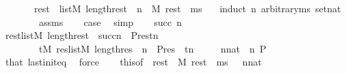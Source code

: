 \begin{isabellebody}
\ \ \ \ \ \ \ {\isacharparenleft}{\kern0pt}{\isasymforall}rest\ {\isasymin}\ list{\isacharparenleft}{\kern0pt}M{\isacharparenright}{\kern0pt}{\isachardot}{\kern0pt}\ length{\isacharparenleft}{\kern0pt}rest{\isacharparenright}{\kern0pt}\ {\isacharequal}{\kern0pt}\ n\ {\isasymlongrightarrow}\ M{\isacharcomma}{\kern0pt}\ rest\ {\isacharat}{\kern0pt}\ ms\ {\isasymTurnstile}\ {\isasymphi}{\isacharparenright}{\kern0pt}{\isachardoublequoteclose}\isanewline
%
\isadelimproof
%
\endisadelimproof
%
\isatagproof
{}\isamarkupfalse%
\ {\isacharparenleft}{\kern0pt}induct\ n\ arbitrary{\isacharcolon}{\kern0pt}ms\ set{\isacharcolon}{\kern0pt}nat{\isacharparenright}{\kern0pt}\isanewline
\ \ \isamarkupfalse%
\ {}\isanewline
\ \ \isamarkupfalse%
\ assms\isanewline
\ \ \isamarkupfalse%
\ {\isacharquery}{\kern0pt}case\ \isamarkupfalse%
\ simp\isanewline
{}\isamarkupfalse%
\isanewline
\ \ \isamarkupfalse%
\ {\isacharparenleft}{\kern0pt}succ\ n{\isacharparenright}{\kern0pt}\isanewline
\ \ \isamarkupfalse%
\ {\isachardoublequoteopen}{\isacharparenleft}{\kern0pt}{\isasymforall}rest{\isasymin}list{\isacharparenleft}{\kern0pt}M{\isacharparenright}{\kern0pt}{\isachardot}{\kern0pt}\ length{\isacharparenleft}{\kern0pt}rest{\isacharparenright}{\kern0pt}\ {\isacharequal}{\kern0pt}\ succ{\isacharparenleft}{\kern0pt}n{\isacharparenright}{\kern0pt}\ {\isasymlongrightarrow}\ P{\isacharparenleft}{\kern0pt}rest{\isacharcomma}{\kern0pt}n{\isacharparenright}{\kern0pt}{\isacharparenright}{\kern0pt}\ {\isasymlongleftrightarrow}\isanewline
\ \ \ \ \ \ \ \ {\isacharparenleft}{\kern0pt}{\isasymforall}t{\isasymin}M{\isachardot}{\kern0pt}\ {\isasymforall}res{\isasymin}list{\isacharparenleft}{\kern0pt}M{\isacharparenright}{\kern0pt}{\isachardot}{\kern0pt}\ length{\isacharparenleft}{\kern0pt}res{\isacharparenright}{\kern0pt}\ {\isacharequal}{\kern0pt}\ n\ {\isasymlongrightarrow}\ P{\isacharparenleft}{\kern0pt}res\ {\isacharat}{\kern0pt}\ {\isacharbrackleft}{\kern0pt}t{\isacharbrackright}{\kern0pt}{\isacharcomma}{\kern0pt}n{\isacharparenright}{\kern0pt}{\isacharparenright}{\kern0pt}{\isachardoublequoteclose}\isanewline
\ \ \ \ \ {\isachardoublequoteopen}n{\isasymin}nat{\isachardoublequoteclose}\ \ n\ P\isanewline
\ \ \ \ \isamarkupfalse%
\ that\ last{\isacharunderscore}{\kern0pt}init{\isacharunderscore}{\kern0pt}eq\ \isamarkupfalse%
\ force\isanewline
\ \ \isamarkupfalse%
\ this{\isacharbrackleft}{\kern0pt}of\ {\isacharunderscore}{\kern0pt}\ {\isachardoublequoteopen}{\isasymlambda}rest\ {\isacharunderscore}{\kern0pt}{\isachardot}{\kern0pt}\ {\isacharparenleft}{\kern0pt}M{\isacharcomma}{\kern0pt}\ rest\ {\isacharat}{\kern0pt}\ ms\ {\isasymTurnstile}\ {\isasymphi}{\isacharparenright}{\kern0pt}{\isachardoublequoteclose}{\isacharbrackright}{\kern0pt}\ {\isacartoucheopen}n{\isasymin}nat{\isacartoucheclose}\isanewline

\end{isabellebody}
